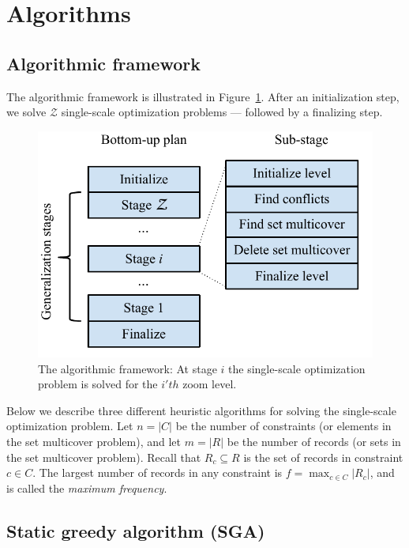 \section{Algorithms}
\label{sec:algorithms}

\subsection{Algorithmic framework}

The algorithmic framework is illustrated in Figure~\ref{fig:algorithmic-framework}. After an initialization step, we solve $\mathcal{Z}$ single-scale optimization problems --- followed by a finalizing step.

\begin{figure}[htbp]
\begin{center}
\includegraphics[scale=.7]{figs/cvl_stages.pdf}
\caption{The algorithmic framework: At stage $i$ the single-scale optimization problem is solved for the $i'th$ zoom level.}
\label{fig:algorithmic-framework}
\end{center}
\end{figure}

Below we describe three different heuristic algorithms for solving the single-scale optimization problem. Let $n=|C|$ be the number of constraints (or elements in the set multicover problem), and let $m=|R|$ be the number of records (or sets in the set multicover problem). Recall that $R_c \subseteq R$ is the set of records in constraint $c \in C$. The largest number of records in any constraint is $f = \max_{c \in C} |R_c|$, and is called the \emph{maximum frequency}.

\subsection{Static greedy algorithm (SGA)}

